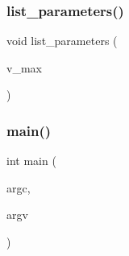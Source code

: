 \subsubsection{\texorpdfstring{list\+\_\+parameters()}{list\_parameters()}}
{\footnotesize\ttfamily void list\+\_\+parameters (\begin{DoxyParamCaption}\item[{\mbox{\hyperlink{galois_8h_a09fddde158a3a20bd2dcadb609de11dc}{I\+NT}}}]{v\+\_\+max }\end{DoxyParamCaption})}

\mbox{\label{srg_8_c_a217dbf8b442f20279ea00b898af96f52}} 
\subsubsection{\texorpdfstring{main()}{main()}}
{\footnotesize\ttfamily int main (\begin{DoxyParamCaption}\item[{int}]{argc,  }\item[{const char $\ast$$\ast$}]{argv }\end{DoxyParamCaption})}

